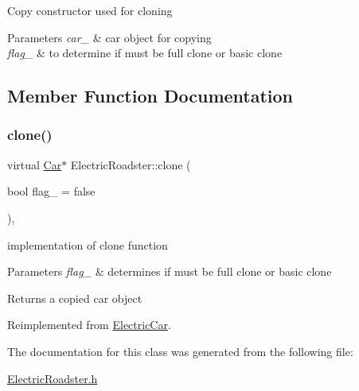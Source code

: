 Copy constructor used for cloning 
\begin{DoxyParams}{Parameters}
{\em car\+\_\+} & car object for copying \\
\hline
{\em flag\+\_\+} & to determine if must be full clone or basic clone \\
\hline
\end{DoxyParams}


\subsection{Member Function Documentation}
\mbox{\label{class_electric_roadster_a4ef7c42355752e28cd2ad97ed1efc047}} 
\subsubsection{\texorpdfstring{clone()}{clone()}}
{\footnotesize\ttfamily virtual \mbox{\hyperlink{class_car}{Car}}$\ast$ Electric\+Roadster\+::clone (\begin{DoxyParamCaption}\item[{bool}]{flag\+\_\+ = {\ttfamily false} }\end{DoxyParamCaption})\hspace{0.3cm}{\ttfamily [inline]}, {\ttfamily [virtual]}}

implementation of clone function 
\begin{DoxyParams}{Parameters}
{\em flag\+\_\+} & determines if must be full clone or basic clone \\
\hline
\end{DoxyParams}
\begin{DoxyReturn}{Returns}
a copied car object 
\end{DoxyReturn}


Reimplemented from \mbox{\hyperlink{class_electric_car_a852de7d2208dea4d45a554d9270508d0}{Electric\+Car}}.



The documentation for this class was generated from the following file\+:\begin{DoxyCompactItemize}
\item 
\mbox{\hyperlink{_electric_roadster_8h}{Electric\+Roadster.\+h}}\end{DoxyCompactItemize}
